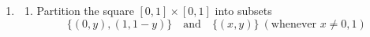 \begin{exercises}{}{}
\begin{enumerate}
% 

	\item\begin{enumerate}
	 	\item Partition the square $[0,1]\times[0,1]$ into subsets
	 	\[
	 		\{(0,y),(1,1-y)\}\quad\text{and}\quad \{(x,y)\} \ (\text{whenever }x\neq 0,1)
	 	\]
		
	\end{enumerate}
\end{enumerate}

\end{exercises}





